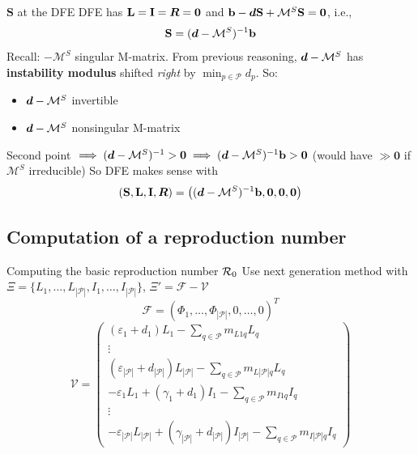 \documentclass[aspectratio=169]{beamer}\usepackage[]{graphicx}\usepackage[]{xcolor}
\begin{document}
\begin{frame}{$\mathbf{S}$ at the DFE}
DFE has $\mathbf{L}=\mathbf{I}=\bm{R}=\mathbf{0}$ and $\mathbf{b}-\bm{d}\mathbf{S}+\mathcal{M}^S\mathbf{S}=\mathbf{0}$, i.e.,
$$
\mathbf{S}=(\bm{d}-\mathcal{M}^S)^{-1}\mathbf{b}
$$
\vfill
Recall: $-\mathcal{M}^S$ singular M-matrix. From previous reasoning, $\bm{d}-\mathcal{M}^S$ has \textbf{instability modulus} shifted \emph{right} by $\min_{p\in\mathcal{P}}d_p$. So:
\begin{itemize}
\item $\bm{d}-\mathcal{M}^S$ invertible
\item $\bm{d}-\mathcal{M}^S$ nonsingular M-matrix
\end{itemize}
\vfill
Second point $\implies (\bm{d}-\mathcal{M}^S)^{-1}>\mathbf{0}\implies (\bm{d}-\mathcal{M}^S)^{-1}\mathbf{b}> \mathbf{0}$  (would have $\gg\mathbf{0}$ if $\mathcal{M}^S$ irreducible)
\vfill
So DFE makes sense with
$$
(\mathbf{S},\mathbf{L},\mathbf{I},\bm{R})=\left((\bm{d}-\mathcal{M}^S)^{-1}\mathbf{b},\mathbf{0},\mathbf{0},\mathbf{0}\right)
$$
\end{frame}

\subsection{Computation of a reproduction number}


\begin{frame}{Computing the basic reproduction number $\mathcal{R}_0$}
Use next generation method with $\Xi=\{L_1,\ldots,L_{|\mathcal{P}|},I_1,\ldots,I_{|\mathcal{P}|}\}$, $\Xi'=\mathcal{F}-\mathcal{V}$
$$
\mathcal{F}=\left(\Phi_1,\ldots,\Phi_{|\mathcal{P}|},0,\ldots,0\right)^T
$$
$$
\mathcal{V}=
\begin{pmatrix}
\left( \varepsilon_{1}+d_{1}\right)L_{1}
-\sum\limits_{q\in\mathcal{P}} m_{L1q}L_{q} \\
\vdots \\
\left( \varepsilon_{|\mathcal{P}|}+d_{|\mathcal{P}|}\right)L_{|\mathcal{P}|}
-\sum\limits_{q\in\mathcal{P}} m_{L|\mathcal{P}|q}L_{q} \\
-\varepsilon_1L_1+(\gamma_1+d_1)I_1
-\sum\limits_{q\in\mathcal{P}} m_{I1q}I_{q} \\
\vdots \\
-\varepsilon_{|\mathcal{P}|}L_{|\mathcal{P}|}
+(\gamma_{|\mathcal{P}|}+d_{|\mathcal{P}|})I_{|\mathcal{P}|}
-\sum\limits_{q\in\mathcal{P}} m_{I|\mathcal{P}|q}I_{q}
\end{pmatrix}
$$
\end{frame}
\end{document}
